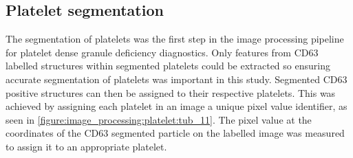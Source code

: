 \subsection{Platelet segmentation}
\label{platelets:image_processing:platelet}
The segmentation of platelets was the first step in the image processing pipeline for platelet dense granule deficiency diagnostics. Only features from CD63 labelled structures within segmented platelets could be extracted so ensuring accurate segmentation of platelets was important in this study. Segmented CD63 positive structures can then be assigned to their respective platelets. This was achieved by assigning each platelet in an image a unique pixel value identifier, as seen in \autoref{figure:image_processing:platelet:tub_11}. The pixel value at the coordinates of the CD63 segmented particle on the labelled image was measured to assign it to an appropriate platelet.

